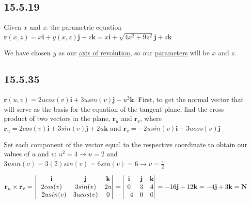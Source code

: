 \documentclass{article}
\begin{document}
\subsection{15.5.19}
\par\noindent\Large Given $x$ and $z$: the parametric equation $\textbf{r}(x, z) = x\textbf{i} + y(x, z)\textbf{j} + z\textbf{k} = x\textbf{i} + \sqrt{4x^{2} + 9z^{2}}\textbf{j} + z\textbf{k}$
\par\noindent\Large We have chosen $y$ as our \underline{axis of revolution}, so our \underline{parameters} will be $x$ and $z$.\vspace{0.25cm}


\subsection{15.5.35}
\par\noindent\Large $\textbf{r}(u, v) = 2ucos(v)\textbf{i} + 3usin(v)\textbf{j} + u^{2}\textbf{k}$.  First, to get the normal vector that will serve as the basis for the equation of the tangent plane, find the cross product of two vectors in the plane, $\textbf{r}_{u}$ and $\textbf{r}_{v}$, where $\textbf{r}_{u} = 2cos(v)\textbf{i} + 3sin(v)\textbf{j} + 2u\textbf{k}$ and $\textbf{r}_{v} = -2usin(v)\textbf{i} + 3ucos(v)\textbf{j}$\vspace{0.25cm}

\par\noindent\Large Set each component of the vector equal to the respective coordinate to obtain our values of $u$ and $v$: $u^{2} = 4 \rightarrow u = 2$ and $3usin(v) = 3(2)sin(v) = 6sin(v) = 6 \rightarrow v = \frac{\pi}{2}$\vspace{0.25cm}

\par\noindent\Large $\textbf{r}_{u}\times\textbf{r}_{v} = \begin{vmatrix}
\textbf{i} & \textbf{j} & \textbf{k} \\ 
2cos(v) & 3sin(v) & 2u \\ 
-2usin(v) & 3ucos(v) & 0  \notag
\end{vmatrix} = \begin{vmatrix}
\textbf{i} & \textbf{j} & \textbf{k} \\ 
0 & 3 & 4 \\ 
-4 & 0 & 0  \notag
\end{vmatrix} = -16\textbf{j} + 12\textbf{k} = -4\textbf{j} + 3\textbf{k} = \textbf{N}$\vspace{0.25cm}
\end{document}
